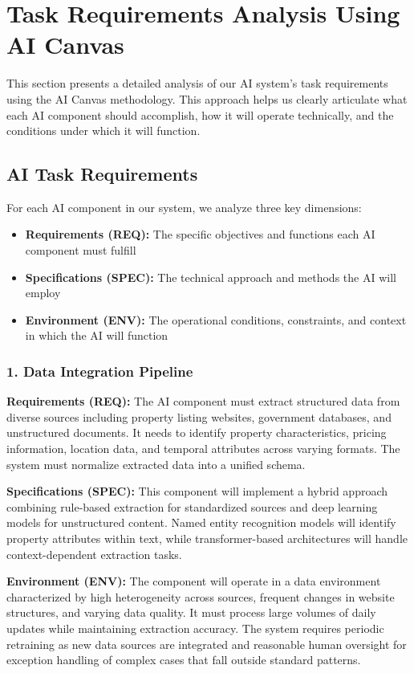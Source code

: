 \section{Task Requirements Analysis Using AI Canvas}

This section presents a detailed analysis of our AI system's task requirements using the AI Canvas methodology. This approach helps us clearly articulate what each AI component should accomplish, how it will operate technically, and the conditions under which it will function.

\subsection{AI Task Requirements}
For each AI component in our system, we analyze three key dimensions:
\begin{itemize}
	\item \textbf{Requirements (REQ):} The specific objectives and functions each AI component must fulfill
	\item \textbf{Specifications (SPEC):} The technical approach and methods the AI will employ
	\item \textbf{Environment (ENV):} The operational conditions, constraints, and context in which the AI will function
\end{itemize}

\subsubsection*{1. Data Integration Pipeline}

\textbf{Requirements (REQ):} The AI component must extract structured data from diverse sources including property listing websites, government databases, and unstructured documents. It needs to identify property characteristics, pricing information, location data, and temporal attributes across varying formats. The system must normalize extracted data into a unified schema.

\textbf{Specifications (SPEC):} This component will implement a hybrid approach combining rule-based extraction for standardized sources and deep learning models for unstructured content. Named entity recognition models will identify property attributes within text, while transformer-based architectures will handle context-dependent extraction tasks.

\textbf{Environment (ENV):} The component will operate in a data environment characterized by high heterogeneity across sources, frequent changes in website structures, and varying data quality. It must process large volumes of daily updates while maintaining extraction accuracy. The system requires periodic retraining as new data sources are integrated and reasonable human oversight for exception handling of complex cases that fall outside standard patterns.

